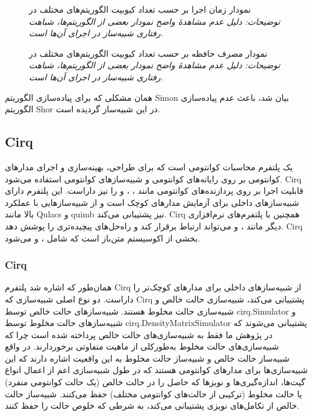 \begin{figure}
	\centering
	\captionsetup{justification=centering}
	
	\caption[نمودار زمان اجرا ]{
		نمودار زمان اجرا بر حسب تعداد کیوبیت الگوریتم‌های مختلف در
		\newline \textit{
			توضیحات: دلیل عدم مشاهد‌هٔ واضح نمودار بعضی از الگوریتم‌ها، شباهت رفتاری شبیه‌ساز در اجرای آن‌ها است.
		}
	}
	\label{fig:9}
	\vspace{1cm}
	\captionsetup{justification=centering}
	
	\caption[نمودار مصرف حافظه ]{
		نمودار مصرف حافظه بر حسب تعداد کیوبیت الگوریتم‌های مختلف در
		\newline \textit{
			توضیحات: دلیل عدم مشاهد‌هٔ واضح نمودار بعضی از الگوریتم‌ها، شباهت رفتاری شبیه‌ساز در اجرای آن‌ها است.
		}
	}
	\label{fig:10}
\end{figure}

همان مشکلی که برای پیاده‌سازی الگوریتم Simon بیان شد، باعث عدم پیاده‌سازی الگوریتم Shor در این شبیه‌ساز گردیده است.

\subsection{Cirq}
یک پلتفرم محاسبات کوانتومی است که برای طراحی، بهینه‌سازی و اجرای مدارهای کوانتومی بر روی رایانه‌های کوانتومی و شبیه‌سازهای کوانتومی استفاده می‌شود. Cirq قابلیت اجرا بر روی پردازنده‌های کوانتومی مانند
، ،  و 
را نیز داراست. این پلتفرم دارای شبیه‌سازهای داخلی برای آزمایش مدارهای کوچک است و از شبیه‌سازهایی با عملکرد بالا مانند Qulacs و quimb نیز پشتیبانی می‌کند. Cirq همچنین با پلتفرم‌های نرم‌افزاری دیگر مانند
،  و 
می‌تواند ارتباط برقرار کند و راه‌حل‌های پیچیده‌تری را پوشش دهد. Cirq بخشی از اکوسیستم متن‌باز
 است که شامل
، 
و
می‌شود.
\subsubsection{Cirq}
همان‌طور که اشاره شد پلتفرم Cirq از شبیه‌سازهای داخلی برای مدارهای کوچک‌تر را داراست. دو نوع اصلی شبیه‌سازی که Cirq پشتیبانی می‌کند، شبیه‌سازی حالت خالص و شبیه‌سازی حالت مخلوط هستند. شبیه‌سازهای حالت خالص توسط cirq.Simulator و شبیه‌سازهای حالت مخلوط توسط cirq.DensityMatrixSimulator پشتیبانی می‌شوند که در پژوهش ما فقط به شبیه‌سازی‌های حالت خالص پرداخته شده است چرا که شبیه‌سازی‌های حالت مخلوط به‌طورکلی از ماهیت متفاوتی برخوردارند. در واقع شبیه‌ساز حالت خالص و شبیه‌ساز حالت مخلوط به این واقعیت اشاره دارند که این شبیه‌سازی‌ها برای مدارهای کوانتومی هستند که در طول شبیه‌سازی اعم از اعمال انواع گیت‌ها، اندازه‌گیری‌ها و نویزها که حاصل را در حالت خالص (یک حالت کوانتومی منفرد) یا حالت مخلوط (ترکیبی از حالت‌های کوانتومی مختلف) حفظ می‌کنند. شبیه‌ساز حالت خالص از تکامل‌های نویزی پشتیبانی می‌کند، به شرطی که خلوص حالت را حفظ کنند.

